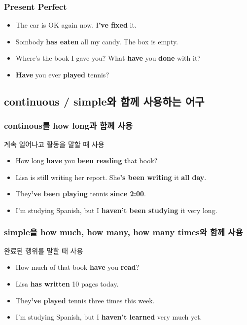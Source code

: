 \documentclass[11pt]{oblivoir}
\begin{document}
\subsubsection{Present Perfect}
\begin{itemize}
  \item The car is OK again now. I\textbf{'ve fixed} it.
  \item Sombody \textbf{has eaten} all my candy. The box is empty.
  \item Where's the book I gave you? What \textbf{have} you \textbf{done} with it?
  \item \textbf{Have} you ever \textbf{played} tennis?
\end{itemize}

\subsection{continuous / simple와 함께 사용하는 어구}
\subsubsection{continous를 how long과 함께 사용}
계속 일어나고 활동을 말할 때 사용 

\begin{itemize}
  \item How long \textbf{have} you \textbf{been reading} that book?
  \item Lisa is still writing her report. She\textbf{'s been writing} it \textbf{all day}.
  \item They\textbf{'ve been playing} tennis \textbf{since 2:00}.
  \item I'm studying Spanish, but I \textbf{haven't been studying} it very long.
\end{itemize}

\subsubsection{simple을 how much, how many, how many times와 함께 사용}
완료된 행위를 말할 때 사용

\begin{itemize}
  \item How much of that book \textbf{have} you \textbf{read}?
  \item Lisa \textbf{has written} 10 pages today.
  \item They\textbf{'ve played} tennis three times this week.
  \item I'm studying Spanish, but I \textbf{haven't learned} very much yet.
\end{itemize}
\end{document}
